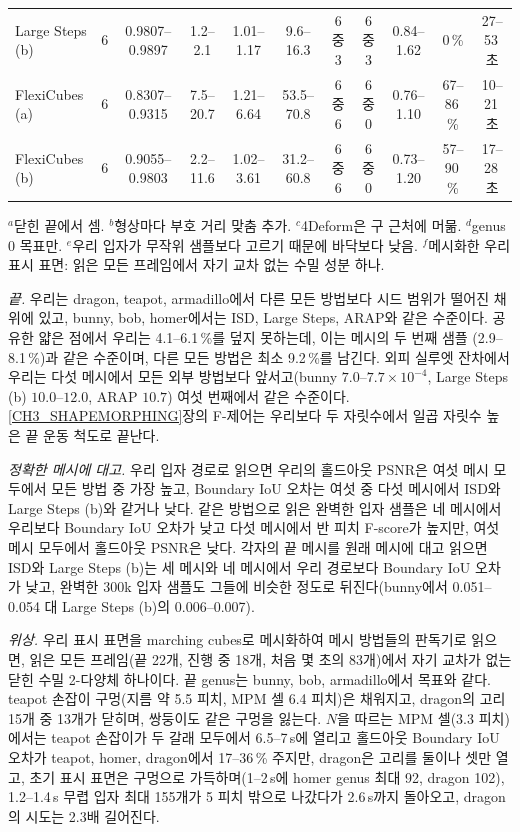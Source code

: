 \begin{table}[t]
{\begin{tabular}{lcccccccccc}
Large Steps (b) & 6 & 0.9807--0.9897 & 1.2--2.1 & 1.01--1.17 & 9.6--16.3 & 6 중 3 & 6 중 3 & 0.84--1.62 & 0\,\% & 27--53\,초 \\
FlexiCubes (a) & 6 & 0.8307--0.9315 & 7.5--20.7 & 1.21--6.64 & 53.5--70.8 & 6 중 6 & 6 중 0 & 0.76--1.10 & 67--86\,\% & 10--21\,초 \\
FlexiCubes (b) & 6 & 0.9055--0.9803 & 2.2--11.6 & 1.02--3.61 & 31.2--60.8 & 6 중 6 & 6 중 0 & 0.73--1.20 & 57--90\,\% & 17--28\,초 \\
\bottomrule
\end{tabular}}
\par\smallskip
\begin{minipage}{\textwidth}\scriptsize
$^a$닫힌 끝에서 셈. $^b$형상마다 부호 거리 맞춤 추가. $^c$4Deform은 구 근처에 머묾. $^d$genus 0 목표만. $^e$우리 입자가
무작위 샘플보다 고르기 때문에 바닥보다 낮음. $^f$메시화한 우리 표시 표면: 읽은 모든 프레임에서 자기 교차 없는 수밀 성분 하나.
\end{minipage}
\end{table}

\textit{끝.} 우리는 dragon, teapot, armadillo에서 다른 모든 방법보다 시드 범위가 떨어진 채 위에 있고, bunny, bob, homer에서는
ISD, Large Steps, ARAP와 같은 수준이다. 공유한 얇은 점에서 우리는 4.1--6.1\,\%를 덮지 못하는데, 이는 메시의 두 번째 샘플
(2.9--8.1\,\%)과 같은 수준이며, 다른 모든 방법은 최소 9.2\,\%를 남긴다. 외피 실루엣 잔차에서 우리는 다섯 메시에서 모든 외부
방법보다 앞서고(bunny $7.0$--$7.7\times10^{-4}$, Large Steps (b) $10.0$--$12.0$, ARAP $10.7$) 여섯 번째에서 같은 수준이다.
\ref{CH3_SHAPEMORPHING}장의 F-제어는 우리보다 두 자릿수에서 일곱 자릿수 높은 끝 운동 척도로 끝난다.

\textit{정확한 메시에 대고.} 우리 입자 경로로 읽으면 우리의 홀드아웃 PSNR은 여섯 메시 모두에서 모든 방법 중 가장 높고, Boundary
IoU 오차는 여섯 중 다섯 메시에서 ISD와 Large Steps (b)와 같거나 낮다. 같은 방법으로 읽은 완벽한 입자 샘플은 네 메시에서 우리보다
Boundary IoU 오차가 낮고 다섯 메시에서 반 피치 F-score가 높지만, 여섯 메시 모두에서 홀드아웃 PSNR은 낮다. 각자의 끝 메시를
원래 메시에 대고 읽으면 ISD와 Large Steps (b)는 세 메시와 네 메시에서 우리 경로보다 Boundary IoU 오차가 낮고, 완벽한 300k 입자
샘플도 그들에 비슷한 정도로 뒤진다(bunny에서 0.051--0.054 대 Large Steps (b)의 0.006--0.007).

\textit{위상.} 우리 표시 표면을 marching cubes로 메시화하여 메시 방법들의 판독기로 읽으면, 읽은 모든 프레임(끝 22개, 진행 중
18개, 처음 몇 초의 83개)에서 자기 교차가 없는 닫힌 수밀 2-다양체 하나이다. 끝 genus는 bunny, bob, armadillo에서 목표와 같다.
teapot 손잡이 구멍(지름 약 5.5 피치, MPM 셀 6.4 피치)은 채워지고, dragon의 고리 15개 중 13개가 닫히며, 쌍둥이도 같은 구멍을
잃는다. $N$을 따르는 MPM 셀(3.3 피치)에서는 teapot 손잡이가 두 갈래 모두에서 6.5--7\,s에 열리고 홀드아웃 Boundary IoU 오차가
teapot, homer, dragon에서 17--36\,\% 주지만, dragon은 고리를 둘이나 셋만 열고, 초기 표시 표면은 구멍으로 가득하며(1--2\,s에
homer genus 최대 92, dragon 102), 1.2--1.4\,s 무렵 입자 최대 155개가 5 피치 밖으로 나갔다가 2.6\,s까지 돌아오고, dragon의 시도는
2.3배 길어진다.

